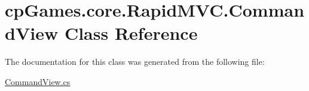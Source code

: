 \hypertarget{classcp_games_1_1core_1_1_rapid_m_v_c_1_1_command_view}{}\section{cp\+Games.\+core.\+Rapid\+M\+V\+C.\+Command\+View Class Reference}
\label{classcp_games_1_1core_1_1_rapid_m_v_c_1_1_command_view}


The documentation for this class was generated from the following file\+:\begin{DoxyCompactItemize}
\item 
\mbox{\hyperlink{_command_view_8cs}{Command\+View.\+cs}}\end{DoxyCompactItemize}
